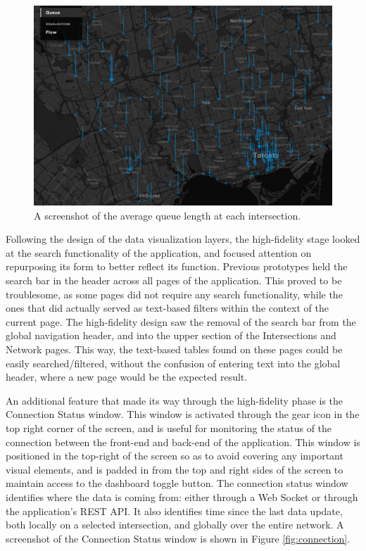\documentclass{report}
\begin{document}
\begin{figure}[htbp!]
  \begin{centering}
    \includegraphics[scale=0.9]{figures/queue.png}
    \caption{A screenshot of the average queue length at each intersection.}
    \label{fig:queue}
  \end{centering}
\end{figure}

Following the design of the data visualization layers, the high-fidelity stage looked at the search functionality of the application, and focused attention on repurposing its form to better reflect its function.
Previous prototypes held the search bar in the header across all pages of the application.
This proved to be troublesome, as some pages did not require any search functionality, while the ones that did actually served as text-based filters within the context of the current page.
The high-fidelity design saw the removal of the search bar from the global navigation header, and into the upper section of the Intersections and Network pages.
This way, the text-based tables found on these pages could be easily searched/filtered, without the confusion of entering text into the global header, where a new page would be the expected result.

An additional feature that made its way through the high-fidelity phase is the Connection Status window.
This window is activated through the gear icon in the top right corner of the screen, and is useful for monitoring the status of the connection between the front-end and back-end of the application.
This window is positioned in the top-right of the screen so as to avoid covering any important visual elements, and is padded in from the top and right sides of the screen to maintain access to the dashboard toggle button.
The connection status window identifies where the data is coming from: either through a Web Socket or through the application's REST API.
It also identifies time since the last data update, both locally on a selected intersection, and globally over the entire network.
A screenshot of the Connection Status window is shown in Figure \ref{fig:connection}.
\end{document}
